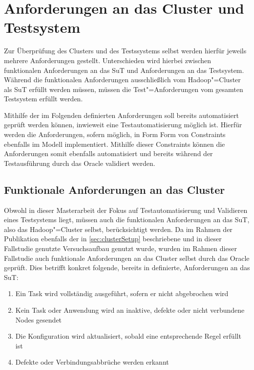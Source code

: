 \section{Anforderungen an das Cluster und Testsystem}
\label{sec:requirements}

Zur Überprüfung des Clusters und des Testssystems selbst werden hierfür jeweils mehrere Anforderungen gestellt.
Unterschieden wird hierbei zwischen funktionalen Anforderungen an das \ac{SuT} und Anforderungen an das Testsystem.
Während die funktionalen Anforderungen ausschließlich vom Hadoop"=Cluster als \ac{SuT} erfüllt werden müssen, müssen die Test"=Anforderungen vom gesamten Testsystem erfüllt werden.

Mithilfe der im Folgenden definierten Anforderungen soll bereits automatisiert geprüft werden können, inwieweit eine Testautomatisierung möglich ist.
Hierfür werden die Anforderungen, sofern möglich, in Form  Form von Constraints ebenfalls im Modell implementiert.
Mithilfe dieser Constraints können die Anforderungen somit ebenfalls automatisiert und bereits während der Testausführung durch das Oracle validiert werden.

\subsection{Funktionale Anforderungen an das Cluster}
\label{subsec:functionalRequirements}

Obwohl in dieser Masterarbeit der Fokus auf Testautomatisierung und Validieren eines Testsystems liegt, müssen auch die funktionalen Anforderungen an das \ac{SuT}, also das Hadoop"=Cluster selbst, berücksichtigt werden.
Da im Rahmen der Publikation \cite{Eberhardinger2018} ebenfalls der in \cref{sec:clusterSetup} beschriebene und in dieser Fallstudie genutzte Versuchsaufbau genutzt wurde, wurden im Rahmen dieser Fallstudie auch funktionale Anforderungen an das Cluster selbst durch das Oracle geprüft.
Dies betrifft konkret folgende, bereits in \cite{Eberhardinger2018} definierte, Anforderungen an das \ac{SuT}:

\begin{enumerate}
    \item Ein Task wird vollständig ausgeführt, sofern er nicht abgebrochen wird
    \item Kein Task oder Anwendung wird an inaktive, defekte oder nicht verbundene Nodes gesendet
    \item Die Konfiguration wird aktualisiert, sobald eine entsprechende Regel erfüllt ist
    \item Defekte oder Verbindungsabbrüche werden erkannt
\end{enumerate}

